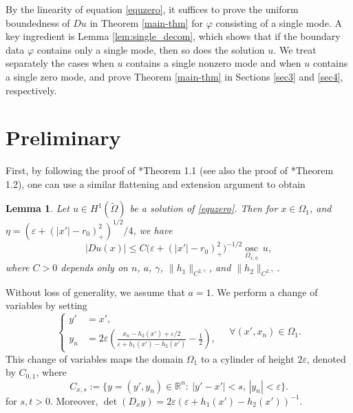 \documentclass[reqno, 10pt]{amsart}
\theoremstyle{plain}
\newtheorem{lemma}[theorem]{Lemma}
\theoremstyle{definition}
\theoremstyle{remark}
\newcommand{\osc}{\operatorname{osc}}
\numberwithin{equation}{section}
\newcommand{\bR}{\mathbb{R}}
\begin{document}
By the linearity of equation \eqref{equzero}, it suffices to prove the uniform boundedness of $Du$ in Theorem \ref{main-thm} for $\varphi$ consisting of a single mode. A key ingredient is Lemma \ref{lem:single_decom}, which shows that if the boundary data $\varphi$ contains only a single mode, then so does the solution $u$. We treat separately the cases when $u$ contains a single nonzero mode and when $u$ contains a single zero mode, and prove Theorem \ref{main-thm} in Sections \ref{sec3} and \ref{sec4}, respectively.





\section{Preliminary}%
First, by following the proof of \cite{LY2}*{Theorem 1.1} (see also the proof of \cite{BLY2}*{Theorem 1.2}), one can use a similar flattening and extension argument 
to obtain 
\begin{lemma}
    Let $u \in H^1({\widetilde\Omega})$ be a solution of \eqref{equzero}. Then for $x\in \Omega_1$, and $\eta=(\varepsilon + (|x'|-r_0)_+^2)^{1/2}/4$, we have
\begin{equation}\label{Du-bound}
    |D u(x)| \le C \big(\varepsilon + (|x'|-r_0)_+^2 \big)^{-1/2}\underset{\Omega_{x,\eta}}{\osc}~u,
\end{equation}
where $C > 0$ depends only on $n$, $a$, $\gamma$, $\|h_1\|_{C^{2,\gamma}}$, and $\|h_2\|_{C^{2,\gamma}}$.
\end{lemma}
Without loss of generality, we assume that $a=1$. We perform a change of variables by setting
\begin{equation}\label{x_to_y}
\left\{
\begin{aligned}
y' &= x' ,\\
y_n &=   2 \varepsilon \left( \frac{x_n - h_2(x') + \varepsilon/2}{\varepsilon + h_1(x') - h_2(x')} - \frac{1}{2} \right) ,
\end{aligned}\right.
\quad \forall (x',x_n) \in \Omega_{1}.
\end{equation}
This change of variables maps the domain $\Omega_{1}$ to a cylinder of height $2\varepsilon$, denoted by $C_{0,1}$, where
\begin{equation}\label{C_x_s}
C_{x,s}:=\{ y = (y',y_n) \in \bR^n:~  |y'-x'| < s,\,  |y_n| < \varepsilon\}.
\end{equation}
for $s,t > 0$. Moreover, $\det (D_x y)=2\varepsilon(\varepsilon + h_1(x') - h_2(x'))^{-1}$.
\end{document}
